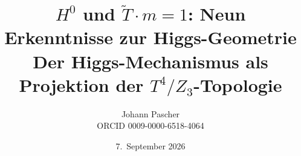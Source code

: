 \documentclass[11pt,a4paper]{report}
\title{$H^0$ und $\tilde{T}\cdot m=1$: Neun Erkenntnisse zur Higgs-Geometrie\\[0.5em]
  \large Der Higgs-Mechanismus als Projektion der $T^4/Z_3$-Topologie}
\date{7.~September 2026}
\author{Johann Pascher\\\small ORCID 0009-0000-6518-4064}
\begin{document}
\renewcommand{\thechapter}{}
\renewcommand{\thesection}{\arabic{section}}
\maketitle
\tableofcontents

\end{document}
